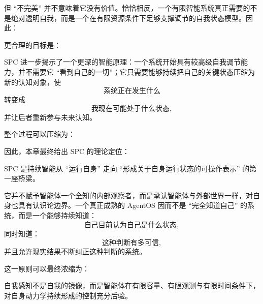 但 ``不完美'' 并不意味着它没有价值。恰恰相反，一个有限智能系统真正需要的不是绝对透明自我，而是一个在有限资源条件下足够支撑调节的自我状态模型。因此：
\begin{statementbox}
\centering
{}
\end{statementbox}
更合理的目标是：
\begin{statementbox}
\centering
{}
\end{statementbox}

SPC 进一步揭示了一个更深的智能原理：一个系统开始具有较高级自我调节能力，并不需要它 ``看到自己的一切''；它只需要能够持续把自己的关键状态压缩为新的认知对象，使
\[
\text{系统正在发生什么}
\]
转变成
\[
\text{我现在可能处于什么状态},
\]
并让后者重新参与未来认知。

整个过程可以压缩为：
\begin{statementbox}
\centering
{}
\end{statementbox}

因此，本章最终给出 SPC 的理论定位：

\begin{statementbox}
SPC 是持续智能从 ``运行自身'' 走向 ``形成关于自身运行状态的可操作表示'' 的第一座桥梁。
\end{statementbox}

它并不赋予智能体一个全知的内部观察者，而是承认智能体与外部世界一样，对自身也具有认识论边界。一个真正成熟的 AgentOS 因而不是 ``完全知道自己'' 的系统，而是一个能够持续知道：
\[
\text{自己目前认为自己是什么状态},
\]
同时知道：
\[
\text{这种判断有多可信},
\]
并且允许现实结果不断纠正这种判断的系统。

这一原则可以最终浓缩为：

\begin{proposition*}
自我感知不是自我的镜像，而是智能体在有限容量、有限观测与有限时间条件下，对自身动力学持续形成的控制充分后验。
\end{proposition*}
